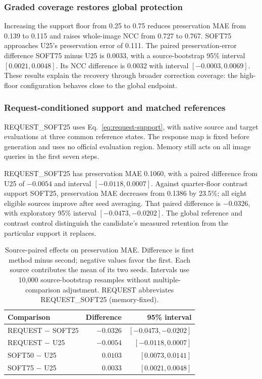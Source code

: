 \subsubsection{Graded coverage restores global protection}
Increasing the support floor from 0.25 to 0.75 reduces preservation MAE from 0.139 to 0.115 and raises whole-image NCC from 0.727 to 0.767. SOFT75 approaches U25's preservation error of 0.111. The paired preservation-error difference SOFT75 minus U25 is $0.0033$, with a source-bootstrap 95\% interval $[0.0021,0.0048]$. Its NCC difference is $0.0032$ with interval $[-0.0003,0.0069]$. These results explain the recovery through broader correction coverage: the high-floor configuration behaves close to the global endpoint.

\subsubsection{Request-conditioned support and matched references}
REQUEST\_SOFT25 uses Eq.~\eqref{eq:request-support}, with native source and target evaluations at three common reference states. The response map is fixed before generation and uses no official evaluation region. Memory still acts on all image queries in the first seven steps.

REQUEST\_SOFT25 has preservation MAE 0.1060, with a paired difference from U25 of $-0.0054$ and interval $[-0.0118,0.0007]$. Against quarter-floor contrast support SOFT25, preservation MAE decreases from 0.1386 by 23.5\%; all eight eligible sources improve after seed averaging. That paired difference is $-0.0326$, with exploratory 95\% interval $[-0.0473,-0.0202]$. The global reference and contrast control distinguish the candidate's measured retention from the particular support it replaces.

\begin{table}[t]
\centering\footnotesize
\caption{Source-paired effects on preservation MAE. Difference is first method minus second; negative values favor the first. Each source contributes the mean of its two seeds. Intervals use 10,000 source-bootstrap resamples without multiple-comparison adjustment. REQUEST abbreviates REQUEST\_SOFT25 (memory-fixed).}
\label{tab:r82-paired}
\begin{tabular}{lrr}
\toprule
Comparison & Difference & 95\% interval\\
\midrule
REQUEST $-$ SOFT25 & $-0.0326$ & $[-0.0473,-0.0202]$\\
REQUEST $-$ U25 & $-0.0054$ & $[-0.0118,0.0007]$\\
SOFT50 $-$ U25 & $0.0103$ & $[0.0073,0.0141]$\\
SOFT75 $-$ U25 & $0.0033$ & $[0.0021,0.0048]$\\
\bottomrule
\end{tabular}
\end{table}

